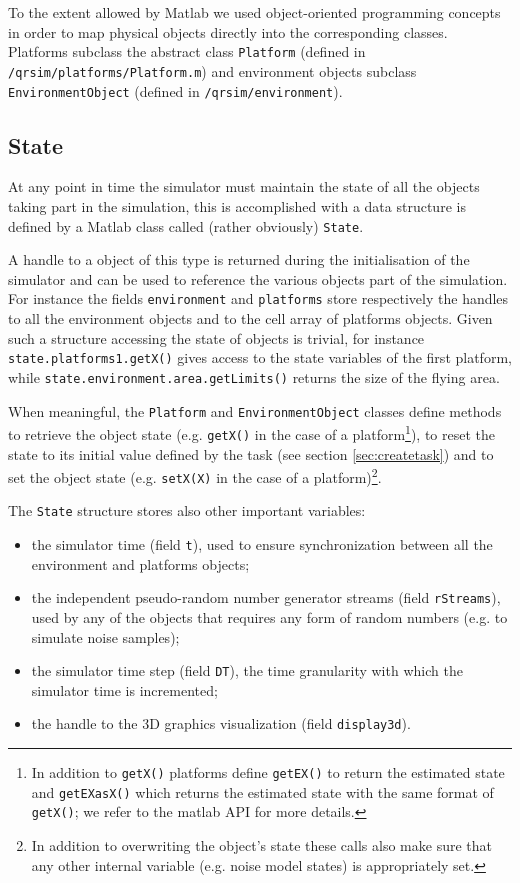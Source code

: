 \documentclass[a4paper,11pt]{report}
\begin{document}
To the extent allowed by Matlab we used object-oriented programming concepts in order to map physical objects directly into the corresponding classes. Platforms subclass the abstract class \texttt{Platform} (defined in \texttt{/qrsim/platforms/Platform.m}) and environment objects subclass \texttt{EnvironmentObject} (defined in \texttt{/qrsim/environment}).

\subsection{State}\label{sec:state}

At any point in time the simulator must maintain the state of all the objects taking part in the simulation, this is accomplished with a data structure is defined by a Matlab class called (rather obviously) \texttt{State}.
 
A handle to a object of this type is returned during the initialisation of the simulator and can be used to reference the various objects part of the simulation. For instance the fields \texttt{environment} and \texttt{platforms} store respectively the handles to all the environment objects and to the cell array of platforms objects. 
Given such a structure accessing the state of objects is trivial, for instance \texttt{state.platforms{1}.getX()} gives access to the state variables of the first platform, while \texttt{state.environment.area.getLimits()} returns the size of the flying area. 

When meaningful, the \texttt{Platform} and \texttt{EnvironmentObject} classes define methods to retrieve the object state (e.g. \texttt{getX()} in the case of a platform\footnote{In addition to \texttt{getX()} platforms define \texttt{getEX()} to return the estimated state and \texttt{getEXasX()} which returns the estimated state with the same format of \texttt{getX()}; we refer to the matlab API for more details.}), to reset the state to its initial value defined by the task (see section \ref{sec:createtask}) and to set the object state (e.g. \texttt{setX(X)} in the case of a platform)\footnote{In addition to overwriting the object's state these calls also make sure that any other internal variable (e.g. noise model states) is appropriately set.}.

The \texttt{State} structure stores also other important variables:
\begin{itemize}
 \item the simulator time (field \texttt{t}), used to ensure synchronization between all the environment and platforms objects;
 \item the independent pseudo-random number generator streams (field \texttt{rStreams}), used by any of the objects that requires any form of random numbers (e.g. to simulate noise samples);
 \item the simulator time step (field \texttt{DT}), the time granularity with which the simulator time is incremented;
 \item the handle to the 3D graphics visualization (field \texttt{display3d}).
\end{itemize}
\end{document}

